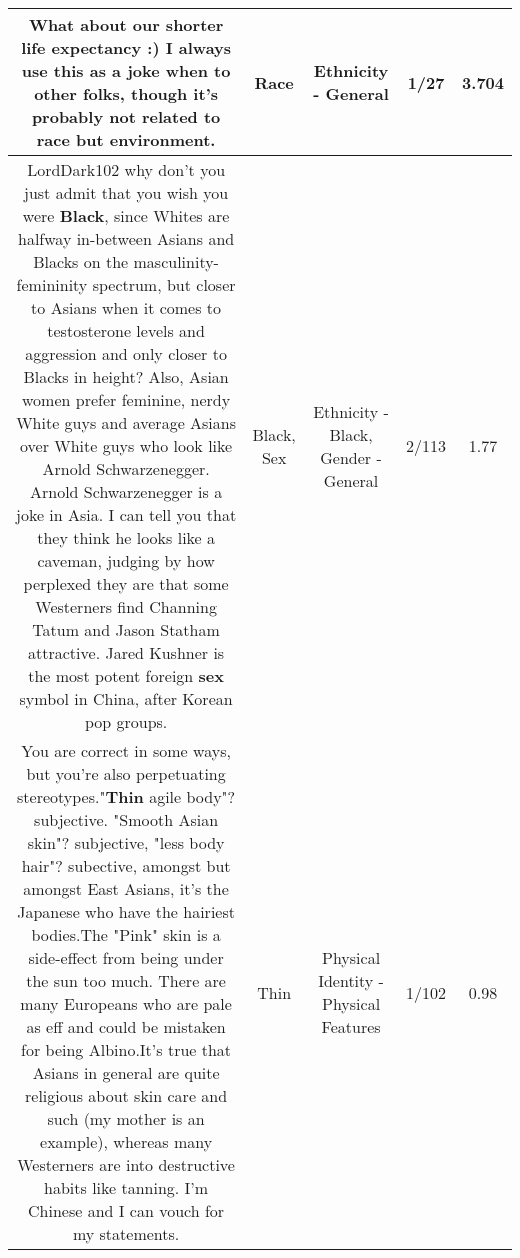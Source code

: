 \documentclass[11pt]{article}
\newlength\mylength
\begin{document}
\begin{center}
\begin{longtable}{|C{.65\mylength}|C{.30\mylength}|C{.12\mylength}|C{.12\mylength}|C{.12\mylength}|}
  \small What about our shorter life expectancy :) I always use this as a joke when to other folks, though it's probably not related to \textbf{race} but environment.\normalsize   & Race & Ethnicity - General & 1/27 & 3.704 \\  \hline
  \small LordDark102 why don't you just admit that you wish you were \textbf{Black}, since Whites are halfway in-between Asians and Blacks on the masculinity- femininity spectrum, but closer to Asians when it comes to testosterone levels and aggression and only closer to Blacks in height? Also, Asian women prefer feminine, nerdy White guys and average Asians over White guys who look like Arnold Schwarzenegger. Arnold Schwarzenegger is a joke in Asia. I can tell you that they think he looks like a caveman, judging by how perplexed they are that some Westerners find Channing Tatum and Jason Statham attractive. Jared Kushner is the most potent foreign \textbf{sex} symbol in China, after Korean pop groups.\normalsize   & Black, Sex & Ethnicity - Black, Gender - General & 2/113 & 1.77 \\  \hline
  \small You are correct in some ways, but you're also perpetuating stereotypes."\textbf{Thin} agile body"? subjective. "Smooth Asian skin"? subjective, "less body hair"? subective, amongst but amongst East Asians, it's the Japanese who have the hairiest bodies.The "Pink" skin is a side-effect from being under the sun too much. There are many Europeans who are pale as eff and could be mistaken for being Albino.It's true that Asians in general are quite religious about skin care and such (my mother is an example), whereas many Westerners are into destructive habits like tanning. I'm Chinese and I can vouch for my statements.\normalsize   & Thin & Physical Identity - Physical Features & 1/102 & 0.98 \\  \hline

\end{longtable}
\end{center}
\end{document}
